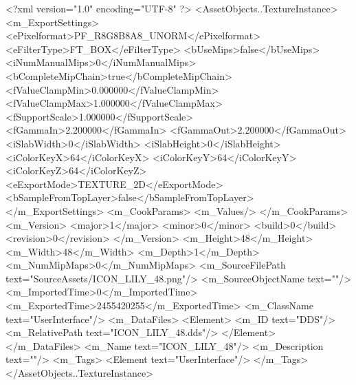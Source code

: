 <?xml version="1.0" encoding="UTF-8" ?>
<AssetObjects..TextureInstance>
	<m_ExportSettings>
		<ePixelformat>PF_R8G8B8A8_UNORM</ePixelformat>
		<eFilterType>FT_BOX</eFilterType>
		<bUseMips>false</bUseMips>
		<iNumManualMips>0</iNumManualMips>
		<bCompleteMipChain>true</bCompleteMipChain>
		<fValueClampMin>0.000000</fValueClampMin>
		<fValueClampMax>1.000000</fValueClampMax>
		<fSupportScale>1.000000</fSupportScale>
		<fGammaIn>2.200000</fGammaIn>
		<fGammaOut>2.200000</fGammaOut>
		<iSlabWidth>0</iSlabWidth>
		<iSlabHeight>0</iSlabHeight>
		<iColorKeyX>64</iColorKeyX>
		<iColorKeyY>64</iColorKeyY>
		<iColorKeyZ>64</iColorKeyZ>
		<eExportMode>TEXTURE_2D</eExportMode>
		<bSampleFromTopLayer>false</bSampleFromTopLayer>
	</m_ExportSettings>
	<m_CookParams>
		<m_Values/>
	</m_CookParams>
	<m_Version>
		<major>1</major>
		<minor>0</minor>
		<build>0</build>
		<revision>0</revision>
	</m_Version>
	<m_Height>48</m_Height>
	<m_Width>48</m_Width>
	<m_Depth>1</m_Depth>
	<m_NumMipMaps>0</m_NumMipMaps>
	<m_SourceFilePath text="SourceAssets/ICON_LILY_48.png"/>
	<m_SourceObjectName text=""/>
	<m_ImportedTime>0</m_ImportedTime>
	<m_ExportedTime>2455420255</m_ExportedTime>
	<m_ClassName text="UserInterface"/>
	<m_DataFiles>
		<Element>
			<m_ID text="DDS"/>
			<m_RelativePath text="ICON_LILY_48.dds"/>
		</Element>
	</m_DataFiles>
	<m_Name text="ICON_LILY_48"/>
	<m_Description text=""/>
	<m_Tags>
		<Element text="UserInterface"/>
	</m_Tags>
</AssetObjects..TextureInstance>

